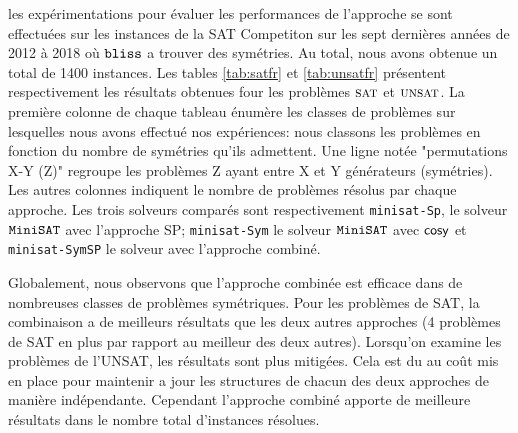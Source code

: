 \begin{table}[!htbp]\footnotesize
	\centering
	\caption{Comparaison des approches sur les instances UNSAT.}
	\label{tab:unsatfr}
\end{table}

les expérimentations pour évaluer les performances de l'approche se sont effectuées sur les instances de la SAT Competiton sur les sept dernières années de 2012 à 2018 où $\texttt{bliss}$ a trouver des symétries. Au total, nous avons obtenue un total de 1400 instances. 
Les tables \ref{tab:satfr} et \ref{tab:unsatfr} présentent respectivement
les résultats obtenues four les problèmes $\textsc{sat}$ et $\textsc{unsat}$.
La première colonne de chaque tableau énumère les classes de problèmes sur lesquelles nous avons effectué nos expériences: nous classons les problèmes en fonction du nombre de symétries qu'ils admettent. Une ligne notée "permutations X-Y (Z)" regroupe les problèmes Z ayant entre X et Y générateurs (symétries). Les autres colonnes indiquent le nombre de problèmes résolus par chaque approche. Les trois solveurs comparés sont respectivement
\texttt{minisat-Sp}, le solveur $\texttt{MiniSAT}$ avec l'approche SP; \texttt{minisat-Sym} le solveur $\texttt{MiniSAT}$ avec $\textsf{cosy}$ et \texttt{minisat-SymSP} le solveur avec l'approche combiné.

Globalement, nous observons que l'approche combinée est efficace dans de nombreuses classes de problèmes symétriques. Pour les problèmes de SAT, la combinaison a de meilleurs résultats que les deux autres approches (4 problèmes de SAT en plus par rapport au meilleur des deux autres). Lorsqu'on examine les problèmes de l'UNSAT, les résultats sont plus mitigées. Cela est du au coût mis en place pour maintenir a jour les structures
de chacun des deux approches de manière indépendante.
Cependant l'approche combiné apporte de meilleure résultats dans le nombre total d'instances résolues.

